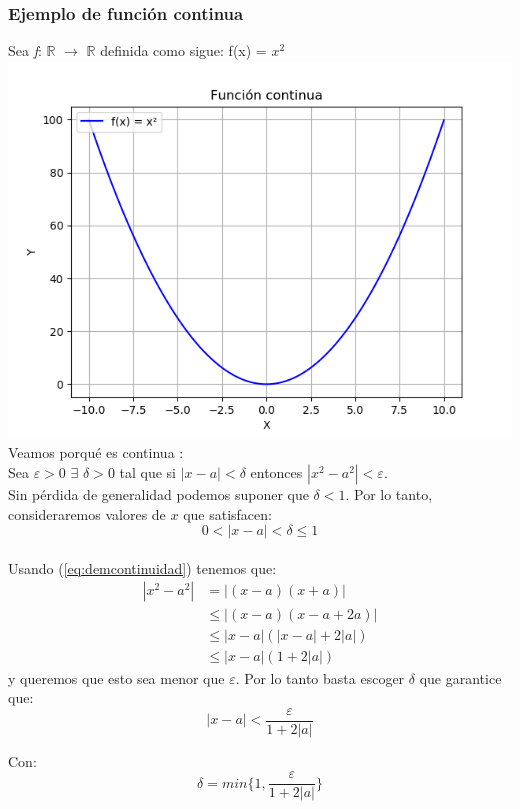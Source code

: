 \documentclass[12pt, letterpaper]{article}
\begin{document}
\subsubsection{Ejemplo de funci\'on continua}
Sea \textit{f}: $\mathbb{R}$ $\rightarrow$ $\mathbb{R}$ definida como sigue: f(x) = $x^2$ \\
\includegraphics[scale=0.8]{funcontinous} \\ 
Veamos porqu\'e es continua \cite{Cimat}:\\
Sea $\varepsilon>0$ $\exists$ $\delta>0$ tal que si $|x-a|<\delta$ entonces $|x^2-a^2|<\varepsilon$.\\
Sin p\'erdida de generalidad podemos suponer que $\delta<1$. Por lo tanto, consideraremos valores de $x$ que satisfacen:\\
\begin{equation}\label{eq:demcontinuidad}
  0 < |x-a| <\delta \le  1 
\end{equation}\\
Usando (\ref{eq:demcontinuidad}) tenemos que:
\begin{align*}
|x^2-a^2|&=|(x-a)(x+a)| \\
		&\le|(x-a)(x-a+2a)| \\
			&\le |x-a|(|x-a|+2|a|)\\
			&\le |x-a|(1+2|a|)
\end{align*}
y queremos que esto sea menor que $\varepsilon$. Por lo tanto basta escoger $\delta$ que garantice que:
\[
  |x-a| < \frac{\varepsilon}{1+2|a|}
\]

Con:
\[
  \delta = min\{1,\frac{\varepsilon}{1+2|a|}\}
\]
\end{document}
